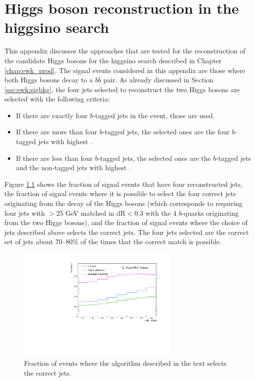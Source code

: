 \chapter{Higgs boson reconstruction in the higgsino search}
\label{app:higgs}

This appendix discusses the approaches that are tested for the reconstruction of the 
candidate Higgs bosons for the higgsino search described in Chapter \ref{chap:ewk_prod}. 
The signal events considered in this appendix are those where both Higgs bosons decay to a $b\bar{b}$ pair. 
As already discussed in Section \ref{sec:ewk:sigbkg}, the four jets selected to reconstruct the two Higgs bosons 
are selected with the following criteria:

\begin{itemize}
\item If there are exactly four $b$-tagged jets in the event, those are used.
\item If there are more than four $b$-tagged jets, the selected ones are the four $b$-tagged jets with highest \pt.
\item If there are less than four $b$-tagged jets, the selected ones are the $b$-tagged jets and the non-tagged jets with highest \pt.
\end{itemize}

Figure  \ref{fig:h_reco_match_possible}  shows the fraction of signal events that have four reconstructed jets, the fraction 
of signal events where it is possible to select the four correct jets originating from the decay of the Higgs bosons 
(which corresponds to requiring four jets with \pt $>$25 GeV  matched in dR$<$0.3 with the 4 $b$-quarks originating from the two Higgs bosons), 
and the fraction of signal events where the choice of jets described above selects the correct jets. 
The four jets selected are the correct set of jets about 70--80\% of the times that the correct match is possible. 


\begin{figure}[h]
\centering
\includegraphics[width=0.7\textwidth]{figures/h_reco/match_possible.pdf}
\caption{Fraction of events where the algorithm described in the text selects the correct jets.}
\label{fig:h_reco_match_possible}
\end{figure}

